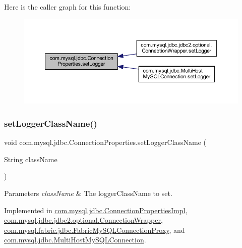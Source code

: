 Here is the caller graph for this function\+:\nopagebreak
\begin{figure}[H]
\begin{center}
\leavevmode
\includegraphics[width=350pt]{interfacecom_1_1mysql_1_1jdbc_1_1_connection_properties_a9ad6baf8983bc1bf352b58b0e1634be1_icgraph}
\end{center}
\end{figure}
\mbox{\label{interfacecom_1_1mysql_1_1jdbc_1_1_connection_properties_a4bde3c5c986dba54cf5ed53038cb7181}} 
\subsubsection{\texorpdfstring{set\+Logger\+Class\+Name()}{setLoggerClassName()}}
{\footnotesize\ttfamily void com.\+mysql.\+jdbc.\+Connection\+Properties.\+set\+Logger\+Class\+Name (\begin{DoxyParamCaption}\item[{String}]{class\+Name }\end{DoxyParamCaption})}


\begin{DoxyParams}{Parameters}
{\em class\+Name} & The logger\+Class\+Name to set. \\
\hline
\end{DoxyParams}


Implemented in \mbox{\hyperlink{classcom_1_1mysql_1_1jdbc_1_1_connection_properties_impl_ae8b725b385d279e4d89dd6cb2bae641d}{com.\+mysql.\+jdbc.\+Connection\+Properties\+Impl}}, \mbox{\hyperlink{classcom_1_1mysql_1_1jdbc_1_1jdbc2_1_1optional_1_1_connection_wrapper_a83bbb6fcf7e7526415776d20aff135fd}{com.\+mysql.\+jdbc.\+jdbc2.\+optional.\+Connection\+Wrapper}}, \mbox{\hyperlink{classcom_1_1mysql_1_1fabric_1_1jdbc_1_1_fabric_my_s_q_l_connection_proxy_aefe48ee60272636a1e6ee1aaf99ddfc0}{com.\+mysql.\+fabric.\+jdbc.\+Fabric\+My\+S\+Q\+L\+Connection\+Proxy}}, and \mbox{\hyperlink{classcom_1_1mysql_1_1jdbc_1_1_multi_host_my_s_q_l_connection_a2d01c838ac3a65f71743aaa28f220ed0}{com.\+mysql.\+jdbc.\+Multi\+Host\+My\+S\+Q\+L\+Connection}}.

